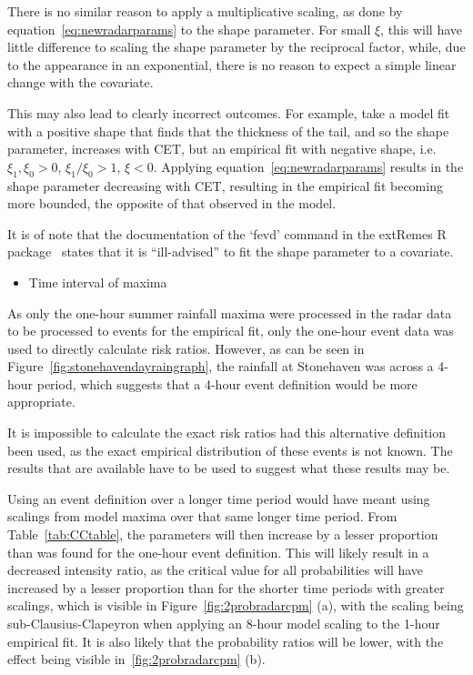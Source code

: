 There is no similar reason to apply a multiplicative scaling,
    as done by equation~\ref{eq:newradarparams} to the shape parameter.
For small $\xi$, this will have little difference to scaling the shape parameter by the reciprocal factor,
    while, due to the appearance in an exponential,
    there is no reason to expect a simple linear change with the covariate.

This may also lead to clearly incorrect outcomes.
For example, take a model fit with a positive shape that finds that the thickness of the tail,
    and so the shape parameter,
    increases with CET,
    but an empirical fit with negative shape, i.e. $\xi_1, \xi_0 > 0$, $\xi_1 / \xi_0 > 1$, $\xi < 0$.
Applying equation~\ref{eq:newradarparams} results in the shape parameter decreasing with CET,
    resulting in the empirical fit becoming more bounded,
    the opposite of that observed in the model.

It is of note that the documentation of the `fevd' command in the extRemes R package~\cite{extremes_R} states
    that it is ``ill-advised'' to fit the shape parameter to a covariate.

\begin{itemize}\item Time interval of maxima\end{itemize}

As only the one-hour summer rainfall maxima were processed in the radar data to be processed to events for the empirical fit,
    only the one-hour event data was used to directly calculate risk ratios.
However,
    as can be seen in Figure~\ref{fig:stonehavendayraingraph},
    the rainfall at Stonehaven was across a 4-hour period,
    which suggests that a 4-hour event definition would be more appropriate.

It is impossible to calculate the exact risk ratios had this alternative definition been used,
    as the exact empirical distribution of these events is not known.
The results that are available have to be used to suggest what these results may be.

Using an event definition over a longer time period would have meant using scalings from model maxima over that same longer time period.
From Table~\ref{tab:CCtable},
    the parameters will then increase by a lesser proportion than was found for the one-hour event definition.
This will likely result in a decreased intensity ratio,
    as the critical value for all probabilities will have increased by a lesser proportion than for the shorter time periods with greater scalings,
    which is visible in Figure~\ref{fig:2probradarcpm} (a),
    with the scaling being sub-Clausius-Clapeyron when applying an 8-hour model scaling to the 1-hour empirical fit.
It is also likely that the probability ratios will be lower,
    with the effect being visible in~\ref{fig:2probradarcpm} (b).

